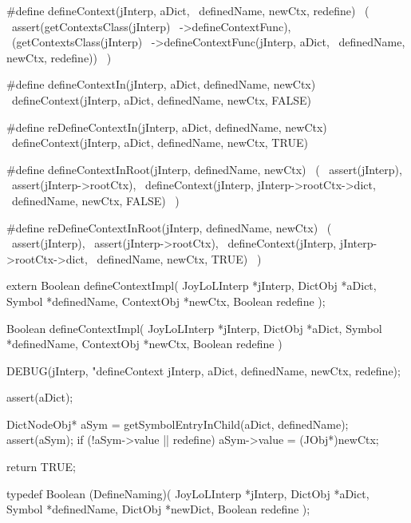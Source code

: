 #define defineContext(jInterp, aDict,     \
  definedName, newCtx, redefine)          \
  (                                       \
    assert(getContextsClass(jInterp)      \
      ->defineContextFunc),               \
    (getContextsClass(jInterp)            \
      ->defineContextFunc(jInterp, aDict, \
        definedName, newCtx, redefine))   \
  )

#define defineContextIn(jInterp, aDict, definedName, newCtx)  \
  defineContext(jInterp, aDict, definedName, newCtx, FALSE)

#define reDefineContextIn(jInterp, aDict, definedName, newCtx)  \
  defineContext(jInterp, aDict, definedName, newCtx, TRUE)

#define defineContextInRoot(jInterp, definedName, newCtx) \
  (                                                       \
    assert(jInterp),                                      \
    assert(jInterp->rootCtx),                             \
    defineContext(jInterp, jInterp->rootCtx->dict,        \
      definedName, newCtx, FALSE)                         \
  )

#define reDefineContextInRoot(jInterp, definedName, newCtx) \
  (                                                         \
    assert(jInterp),                                        \
    assert(jInterp->rootCtx),                               \
    defineContext(jInterp, jInterp->rootCtx->dict,          \
      definedName, newCtx, TRUE)                            \
  )
\stopCHeader

\setCHeaderStream{private}
\startCHeader
extern Boolean defineContextImpl(
  JoyLoLInterp *jInterp,
  DictObj      *aDict,
  Symbol       *definedName,
  ContextObj   *newCtx,
  Boolean       redefine
);
\stopCHeader
\setCHeaderStream{public}

\startCCode
Boolean defineContextImpl(
  JoyLoLInterp *jInterp,
  DictObj      *aDict,
  Symbol       *definedName,
  ContextObj   *newCtx,
  Boolean       redefine
) {
  DEBUG(jInterp, "defineContext %
        jInterp, aDict, definedName, newCtx, redefine);

  assert(aDict);
  
  DictNodeObj* aSym = getSymbolEntryInChild(aDict, definedName);
  assert(aSym);
  if (!aSym->value || redefine) {
    aSym->value   = (JObj*)newCtx;
  }

  return TRUE;
}
\stopCCode

\startCHeader
typedef Boolean (DefineNaming)(
  JoyLoLInterp *jInterp,
  DictObj      *aDict,
  Symbol       *definedName,
  DictObj      *newDict,
  Boolean       redefine
);

